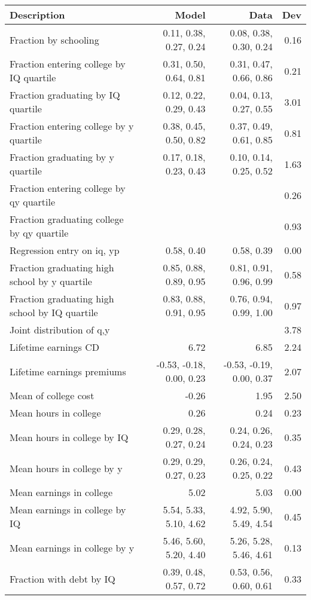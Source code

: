 \begin{tabular}{lrrr}
\hline
Description & Model  & Data  & Dev  \\ 
\hline
Fraction by schooling & 0.11, 0.38, 0.27, 0.24  & 0.08, 0.38, 0.30, 0.24  & 0.16  \\ 
Fraction entering college by IQ quartile & 0.31, 0.50, 0.64, 0.81  & 0.31, 0.47, 0.66, 0.86  & 0.21  \\ 
Fraction graduating by IQ quartile & 0.12, 0.22, 0.29, 0.43  & 0.04, 0.13, 0.27, 0.55  & 3.01  \\ 
Fraction entering college by y quartile & 0.38, 0.45, 0.50, 0.82  & 0.37, 0.49, 0.61, 0.85  & 0.81  \\ 
Fraction graduating by y quartile & 0.17, 0.18, 0.23, 0.43  & 0.10, 0.14, 0.25, 0.52  & 1.63  \\ 
Fraction entering college by qy quartile &   &   & 0.26  \\ 
Fraction graduating college by qy quartile &   &   & 0.93  \\ 
Regression entry on iq, yp & 0.58, 0.40  & 0.58, 0.39  & 0.00  \\ 
Fraction graduating high school by y quartile & 0.85, 0.88, 0.89, 0.95  & 0.81, 0.91, 0.96, 0.99  & 0.58  \\ 
Fraction graduating high school by IQ quartile & 0.83, 0.88, 0.91, 0.95  & 0.76, 0.94, 0.99, 1.00  & 0.97  \\ 
Joint distribution of q,y &   &   & 3.78  \\ 
Lifetime earnings CD & 6.72  & 6.85  & 2.24  \\ 
Lifetime earnings premiums & -0.53, -0.18, 0.00, 0.23  & -0.53, -0.19, 0.00, 0.37  & 2.07  \\ 
Mean of college cost & -0.26  & 1.95  & 2.50  \\ 
Mean hours in college & 0.26  & 0.24  & 0.23  \\ 
Mean hours in college by IQ & 0.29, 0.28, 0.27, 0.24  & 0.24, 0.26, 0.24, 0.23  & 0.35  \\ 
Mean hours in college by y & 0.29, 0.29, 0.27, 0.23  & 0.26, 0.24, 0.25, 0.22  & 0.43  \\ 
Mean earnings in college & 5.02  & 5.03  & 0.00  \\ 
Mean earnings in college by IQ & 5.54, 5.33, 5.10, 4.62  & 4.92, 5.90, 5.49, 4.54  & 0.45  \\ 
Mean earnings in college by y & 5.46, 5.60, 5.20, 4.40  & 5.26, 5.28, 5.46, 4.61  & 0.13  \\ 
Fraction with debt by IQ & 0.39, 0.48, 0.57, 0.72  & 0.53, 0.56, 0.60, 0.61  & 0.33  \\ 

\end{tabular}
